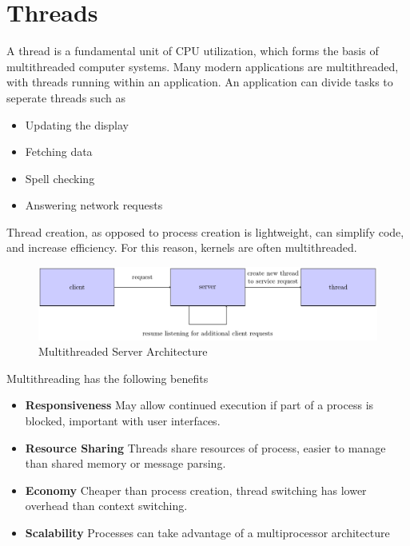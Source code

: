 \documentclass[oneside]{book}
\begin{document}
    \chapter{Threads}
            A thread is a fundamental unit of CPU utilization, which forms the basis of multithreaded computer systems.
            Many modern applications are multithreaded, with threads running within an application. An application can divide tasks to seperate threads
            such as
            \begin{itemize}
                \item Updating the display
                \item Fetching data
                \item Spell checking
                \item Answering network requests
            \end{itemize}
            Thread creation, as opposed to process creation is lightweight, can simplify code, and increase efficiency. For this reason, kernels are often
            multithreaded.
            \begin{figure}[H]
                \centering
                \includegraphics{figures/multithreader_server.pdf}
                \caption{Multithreaded Server Architecture}
            \end{figure}
            Multithreading has the following benefits
            \begin{itemize}
                \item \textbf{Responsiveness}
                    \subitem May allow continued execution if part of a process is blocked, important with user interfaces.
                \item \textbf{Resource Sharing}
                    \subitem Threads share resources of process, easier to manage than shared memory or message parsing.
                \item \textbf{Economy}
                    \subitem Cheaper than process creation, thread switching has lower overhead than context switching.
                \item \textbf{Scalability}
                    \subitem Processes can take advantage of a multiprocessor architecture
            \end{itemize}
\end{document}
